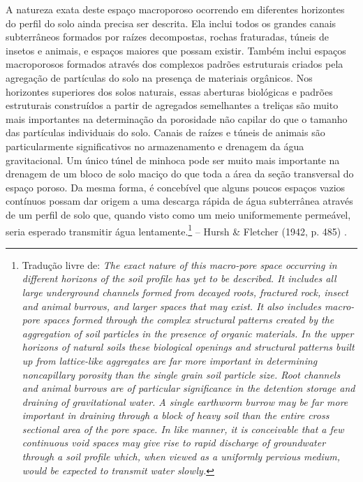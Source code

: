 \documentclass[./main.tex]{subfiles}
\begin{document}
\begin{adjustwidth}{100pt}{0pt}
\medskip
\small A natureza exata deste espaço macroporoso ocorrendo em diferentes horizontes do perfil do solo ainda precisa ser descrita. Ela inclui todos os grandes canais subterrâneos formados por raízes decompostas, rochas fraturadas, túneis de insetos e animais, e espaços maiores que possam existir. Também inclui espaços macroporosos formados através dos complexos padrões estruturais criados pela agregação de partículas do solo na presença de materiais orgânicos. Nos horizontes superiores dos solos naturais, essas aberturas biológicas e padrões estruturais construídos a partir de agregados semelhantes a treliças são muito mais importantes na determinação da porosidade não capilar do que o tamanho das partículas individuais do solo. Canais de raízes e túneis de animais são particularmente significativos no armazenamento e drenagem da água gravitacional. Um único túnel de minhoca pode ser muito mais importante na drenagem de um bloco de solo maciço do que toda a área da seção transversal do espaço poroso. Da mesma forma, é concebível que alguns poucos espaços vazios contínuos possam dar origem a uma descarga rápida de água subterrânea através de um perfil de solo que, quando visto como um meio uniformemente permeável, seria esperado transmitir água lentamente.\footnote{Tradução livre de: \textit{The exact nature of this macro-pore space occurring in different horizons of the soil profile has yet to be described. It includes all large underground channels formed from decayed roots, fractured rock, insect and animal burrows, and larger spaces that may exist. It also includes macro-pore spaces formed through the complex structural patterns created by the aggregation of soil particles in the presence of organic materials. In the upper horizons of natural soils these biological openings and structural patterns built up from lattice-like aggregates are far more important in determining noncapillary porosity than the single grain soil particle size. Root channels and animal burrows are of particular significance in the detention storage and draining of gravitational water. A single earthworm burrow may be far more important in draining through a block of heavy soil than the entire cross sectional area of the pore space. In like manner, it is conceivable that a few continuous void spaces may give rise to rapid discharge of groundwater through a soil profile which, when viewed as a uniformly pervious medium, would be expected to transmit water slowly.}} -- Hursh \& Fletcher (1942, p. 485) \cite{Hursh1942}.
\medskip
\end{adjustwidth}
\end{document}
